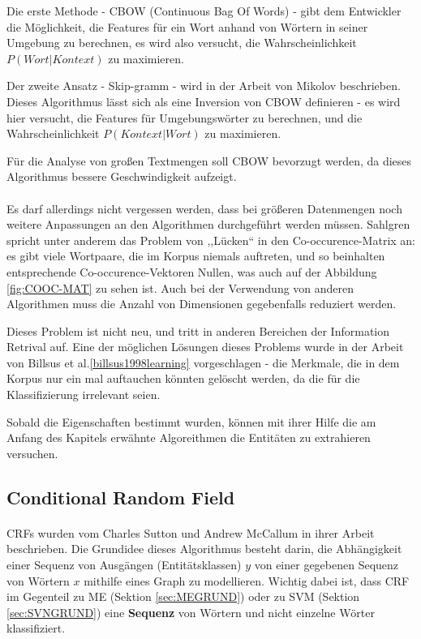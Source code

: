 Die erste Methode - CBOW (Continuous Bag Of Words\cite{garcia2014word}) - gibt dem Entwickler die Möglichkeit, die Features für ein Wort anhand von Wörtern in seiner Umgebung zu berechnen, es wird also versucht, die Wahrscheinlichkeit $P(Wort|Kontext)$ zu maximieren.

Der zweite Ansatz - Skip-gramm - wird in der Arbeit von Mikolov\cite{mikolov2013distributed} beschrieben. Dieses Algorithmus lässt sich als eine Inversion von CBOW  definieren - es wird hier versucht, die Features für Umgebungswörter zu berechnen, und die Wahrscheinlichkeit $P(Kontext|Wort)$ zu maximieren.

Für die Analyse von großen Textmengen soll CBOW bevorzugt werden, da dieses Algorithmus bessere Geschwindigkeit aufzeigt\cite{wang2014introduction}. 

\paragraph{}
Es darf allerdings nicht vergessen werden, dass bei größeren Datenmengen noch weitere Anpassungen an den Algorithmen durchgeführt werden müssen. Sahlgren\cite{sahlgren2006word} spricht unter anderem das Problem von ,,Lücken`` in den Co-occurence-Matrix an: es gibt viele Wortpaare, die im Korpus niemals auftreten, und so beinhalten entsprechende Co-occurence-Vektoren Nullen, was auch auf der Abbildung \ref{fig:COOC-MAT} zu sehen ist. Auch bei der Verwendung von anderen Algorithmen muss die Anzahl von Dimensionen gegebenfalls reduziert werden.

Dieses Problem ist nicht neu, und tritt in anderen Bereichen der Information Retrival auf. Eine der möglichen Lösungen dieses Problems wurde in der Arbeit von Billsus et al.\ref{billsus1998learning} vorgeschlagen - die Merkmale, die in dem Korpus nur ein mal auftauchen könnten gelöscht werden, da die für die Klassifizierung irrelevant seien.

Sobald die Eigenschaften bestimmt wurden, können mit ihrer Hilfe die am Anfang des Kapitels erwähnte Algoreithmen die Entitäten zu extrahieren versuchen.

\subsection{Conditional Random Field} \label{subsec:crftheory}
\paragraph{}
CRFs wurden vom Charles Sutton und Andrew McCallum in ihrer Arbeit\cite{Charles/Andrew:10} beschrieben. Die Grundidee dieses Algorithmus besteht darin, die Abhängigkeit einer Sequenz von Ausgängen (Entitätsklassen) $y$ von einer gegebenen Sequenz von Wörtern $x$ mithilfe eines Graph zu modellieren. Wichtig dabei ist, dass CRF im Gegenteil zu ME (Sektion \ref{sec:MEGRUND}) oder zu SVM (Sektion \ref{sec:SVNGRUND}) eine \textbf{Sequenz} von Wörtern und nicht einzelne Wörter klassifiziert\cite{rossler2007korpus}.

